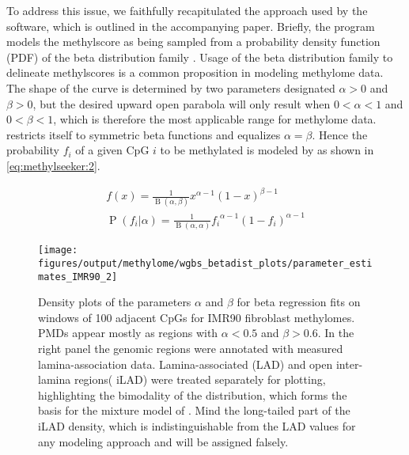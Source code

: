 To address this issue, we faithfully recapitulated the approach used by the software, which is outlined in the accompanying paper\cite{Burger2013}. Briefly, the  program models the methylscore as being sampled from a probability density function (PDF) of the beta distribution family . Usage of the beta distribution family to delineate methylscores is a common proposition in modeling methylome data\cite{Kuan2010,Hebestreit2013,Song2013}. The shape of the curve is determined by two parameters designated $\alpha > 0$ and $\beta >0 $, but the desired upward open parabola will only result when $0 < \alpha < 1$ and $0 < \beta < 1$, which is therefore the most applicable range for methylome data.  restricts itself to symmetric beta functions and equalizes $\alpha = \beta$. Hence the probability $f_i$ of a given CpG $i$ to be methylated is modeled by  as shown in \autoref{eq:methylseeker:2}\cite{Burger2013}. 

\begin{eqnarray}
\label{eq:methylseeker:1} f(x) = \frac{1}{\operatorname{B} (\alpha,\beta)} x^{\alpha-1}(1-x)^{\beta-1} \\
\label{eq:methylseeker:2} \operatorname{P}(f_i|\alpha) = \frac{1}{\operatorname{B} (\alpha,\alpha)} {f_i}^{\alpha-1}(1-f_i)^{\alpha-1}
\end{eqnarray}

\begin{figure}[!ht]
	\centering
	\texttt{[image: figures/output/methylome/wgbs\_betadist\_plots/parameter\_estimates\_IMR90\_2]} 	
	\caption{Density plots of the parameters $\alpha$ and $\beta$ for beta regression fits on windows of \num{100} adjacent CpGs for IMR90 fibroblast methylomes. PMDs appear mostly as regions with $\alpha < 0.5$ and $\beta > 0.6$. In the right panel the genomic regions were annotated with measured lamina-association data\cite{Guelen2008}. Lamina-associated (LAD) and open inter-lamina regions( iLAD) were treated separately for plotting, highlighting the bimodality of the distribution, which forms the basis for the mixture model of . Mind the long-tailed part of the iLAD density, which is indistinguishable from the LAD values for any modeling approach and will be assigned falsely.}
	\label{fig:wgbs_IMR90_distributions_beta.pdf}
\end{figure}

